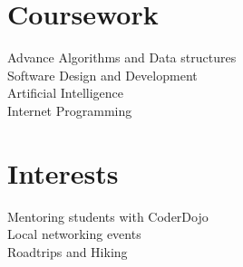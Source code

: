 \documentclass[]{rinkal_resume}
\begin{document}
\begin{minipage}[t]{0.30\textwidth}
\sectionsep

\section{Coursework}
Advance Algorithms and Data structures \\
Software Design and Development \\
Artificial Intelligence \\
Internet Programming \\
\sectionsep

\section{Interests}
\textbullet{} Mentoring students with CoderDojo\\
\textbullet{} Local networking events\\
\textbullet{} Roadtrips and Hiking \\
%
%

\end{minipage} 
\hfill
\end{document}
